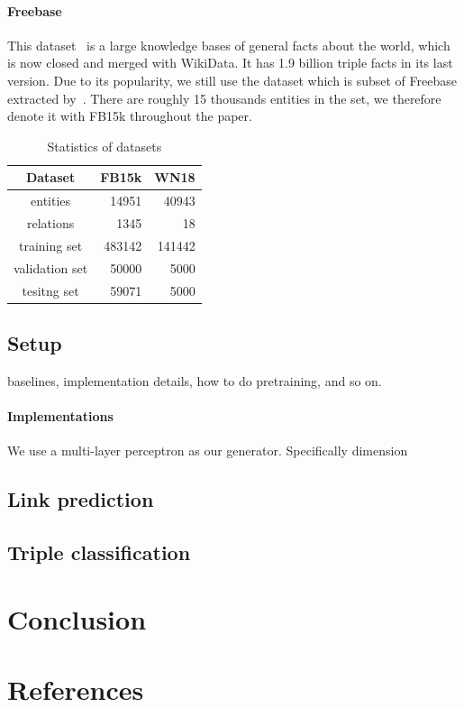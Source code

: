 \documentclass[twocolumn,a4paper,10pt,review,5p]{elsarticle}
\begin{document}
\paragraph{Freebase} This dataset~\cite{bollacker2008freebase} is a large knowledge bases of general facts about the world, which is now closed and merged with WikiData. It has 1.9 billion triple facts in its last version. Due to its popularity, we still use the dataset which is subset of Freebase extracted by~\cite{TransE2013}. There are roughly 15 thousands entities in the set, we therefore denote it with FB15k throughout the paper.


\begin{table}
    \centering
    \begin{tabular}{crr}
        \toprule
        Dataset & FB15k & WN18 \\
        \midrule
        entities &  14951   &  40943  \\
        relations &  1345   & 18 \\
        training set &  483142   & 141442 \\
        validation set &  50000   & 5000 \\
        tesitng set &  59071  & 5000 \\
        \bottomrule
    \end{tabular}
    \caption{Statistics of datasets}
\label{datasets}
\end{table}


\subsection{Setup}

baselines, implementation details, how to do pretraining, and so on.

\paragraph{Implementations} We use a multi-layer perceptron as our generator. Specifically dimension

\subsection{Link prediction}



\subsection{Triple classification}


\section{Conclusion}

\section*{References}


\end{document}
